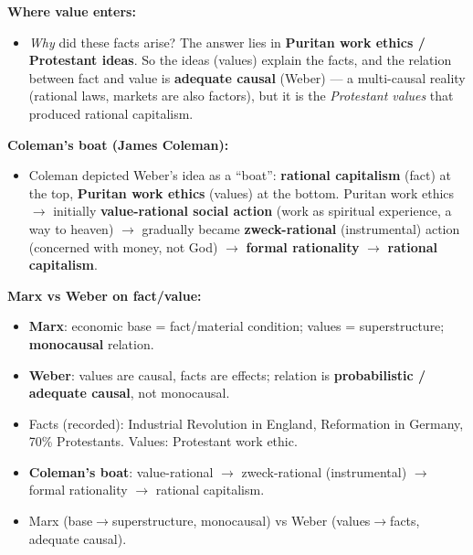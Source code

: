 \begin{KeyConcept}
\textbf{Where value enters:}
\begin{itemize}
\item \textit{Why} did these facts arise? The answer lies in \textbf{Puritan work ethics / Protestant ideas}. So the ideas (values) explain the facts, and the relation between fact and value is \textbf{adequate causal} (Weber) --- a multi-causal reality (rational laws, markets are also factors), but it is the \textit{Protestant values} that produced rational capitalism.
\end{itemize}
\end{KeyConcept}

\begin{DataFact}
\textbf{Coleman's boat (James Coleman):}
\begin{itemize}
\item Coleman depicted Weber's idea as a ``boat'': \textbf{rational capitalism} (fact) at the top, \textbf{Puritan work ethics} (values) at the bottom. Puritan work ethics $\rightarrow$ initially \textbf{value-rational social action} (work as spiritual experience, a way to heaven) $\rightarrow$ gradually became \textbf{zweck-rational} (instrumental) action (concerned with money, not God) $\rightarrow$ \textbf{formal rationality} $\rightarrow$ \textbf{rational capitalism}.
\end{itemize}
\end{DataFact}

\begin{ComparisonBox}
\textbf{Marx vs Weber on fact/value:}
\begin{itemize}
\item \textbf{Marx}: economic base = fact/material condition; values = superstructure; \textbf{monocausal} relation.
\item \textbf{Weber}: values are causal, facts are effects; relation is \textbf{probabilistic / adequate causal}, not monocausal.
\end{itemize}
\end{ComparisonBox}

\begin{QuickRevision}
\begin{itemize}
\item Facts (recorded): Industrial Revolution in England, Reformation in Germany, 70\% Protestants. Values: Protestant work ethic.
\item \textbf{Coleman's boat}: value-rational $\rightarrow$ zweck-rational (instrumental) $\rightarrow$ formal rationality $\rightarrow$ rational capitalism.
\item Marx (base$\rightarrow$superstructure, monocausal) vs Weber (values$\rightarrow$facts, adequate causal).
\end{itemize}
\end{QuickRevision}

